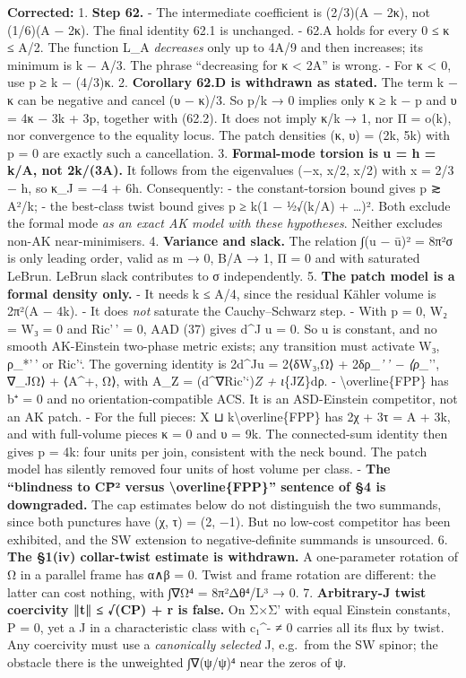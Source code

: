 \documentclass[
  10pt,
]{report}
\begin{document}
\textbf{Corrected:} 1. \textbf{Step 62.} - The intermediate coefficient
is (2/3)(A − 2κ), not (1/6)(A − 2κ). The final identity 62.1 is
unchanged. - 62.A holds for every 0 ≤ κ ≤ A/2. The function L\_A
\emph{decreases} only up to 4A/9 and then increases; its minimum is k −
A/3. The phrase ``decreasing for κ \textless{} 2A'' is wrong. - For κ
\textless{} 0, use p ≥ k − (4/3)κ. 2. \textbf{Corollary 62.D is
withdrawn as stated.} The term k − κ can be negative and cancel (υ −
κ)/3. So p/k → 0 implies only κ ≥ k − p and υ = 4κ − 3k + 3p, together
with (62.2). It does not imply κ/k → 1, nor Π = o(k), nor convergence to
the equality locus. The patch densities (κ, υ) = (2k, 5k) with p = 0 are
exactly such a cancellation. 3. \textbf{Formal-mode torsion is u = h =
k/A, not 2k/(3A).} It follows from the eigenvalues (−x, x/2, x/2) with x
= 2/3 − h, so κ\_J = −4 + 6h. Consequently: - the constant-torsion bound
gives p ≳ A²/k; - the best-class twist bound gives p ≥ k(1 − ½√(k/A) +
\ldots)². Both exclude the formal mode \emph{as an exact AK model with
these hypotheses}. Neither excludes non-AK near-minimisers. 4.
\textbf{Variance and slack.} The relation ∫(u − ū)² = 8π²σ is only
leading order, valid as m → 0, B/A → 1, Π = 0 and with saturated LeBrun.
LeBrun slack contributes to σ independently. 5. \textbf{The patch model
is a formal density only.} - It needs k ≤ A/4, since the residual Kähler
volume is 2π²(A − 4k). - It does \emph{not} saturate the Cauchy--Schwarz
step. - With p = 0, W₂ = W₃ = 0 and Ric'\,' = 0, AAD (37) gives d\^{}J u
= 0. So u is constant, and no smooth AK-Einstein two-phase metric
exists; any transition must activate W₃, ρ\_*'\,' or Ric'`. The
governing identity is 2d\^{}Ju = 2⟨δW₃,Ω⟩ + 2δρ\_\emph{'\,' − ⟨ρ\_}'',
∇\_JΩ⟩ + ⟨A\^{}+, Ω⟩, with A\_Z = (d\^{}∇Ric'`)\emph{Z + ι}\{JZ\}dρ. -
\textbackslash overline\{FPP\} has b⁺ = 0 and no orientation-compatible
ACS. It is an ASD-Einstein competitor, not an AK patch. - For the full
pieces: X ⊔ k\textbackslash overline\{FPP\} has 2χ + 3τ = A + 3k, and
with full-volume pieces κ = 0 and υ = 9k. The connected-sum identity
then gives p = 4k: four units per join, consistent with the neck bound.
The patch model has silently removed four units of host volume per
class. - \textbf{The ``blindness to CP̄² versus
\textbackslash overline\{FPP\}'' sentence of §4 is downgraded.} The cap
estimates below do not distinguish the two summands, since both
punctures have (χ, τ) = (2, −1). But no low-cost competitor has been
exhibited, and the SW extension to negative-definite summands is
unsourced. 6. \textbf{The §1(iv) collar-twist estimate is withdrawn.} A
one-parameter rotation of Ω in a parallel frame has α∧β = 0. Twist and
frame rotation are different: the latter can cost nothing, with
∫\textbar∇Ω\textbar⁴ = 8π²Δθ⁴/L³ → 0. 7. \textbf{Arbitrary-J twist
coercivity ‖t‖ ≤ √(CP) + r is false.} On Σ×Σ' with equal Einstein
constants, P = 0, yet a J in a characteristic class with c₁\^{}- ≠ 0
carries all its flux by twist. Any coercivity must use a
\emph{canonically selected} J, e.g.~from the SW spinor; the obstacle
there is the unweighted ∫\textbar∇(ψ/\textbar ψ\textbar)\textbar⁴ near
the zeros of ψ.
\end{document}
